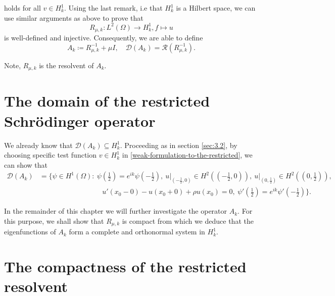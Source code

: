 holds for all $v \in H^{1}_{k}$. Using the last remark, i.e that $H^{1}_{k}$ is a Hilbert space, we can use similar arguments as above to prove that 
	\[ R_{\mu, k} \colon L^{2}(\Omega) \rightarrow H^{1}_{k},  f \mapsto u \]
is well-defined and injective. Consequently, we are able to define
	\[ A_{k} \coloneqq R_{\mu, k}^{-1} + \mu I, \quad \mathcal{D}(A_{k}) = \mathcal{R}(R_{\mu, k}^{-1}). \] 
	
\begin{remark}
	Note, $R_{\mu, k}$ is the resolvent of $A_{k}$.
\end{remark}

\section{The domain of the restricted Schrödinger operator}

We already know that $\mathcal{D}(A_{k}) \subseteq H^{1}_{k}$. Proceeding as in section \ref{sec:3.2}, by choosing specific test function $v \in H^{1}_{k}$ in \eqref{weak-formulation-to-the-restricted}, we can show that
\begin{align*}
	\mathcal{D}(A_{k}) & = \Big\{ \psi \in H^{1}(\Omega) \colon ~\psi\left(\frac{1}{2}\right) = e^{ik} \psi\left(-\frac{1}{2}\right), ~ u\big|_{\left(-\frac{1}{2}, 0\right)} \in H^{2}\left(\left(-\frac{1}{2}, 0\right)\right), ~ u\big|_{\left(0, \frac{1}{2}\right)} \in H^{2}\left(\left(0, \frac{1}{2}\right)\right),  \\
	& ~\qquad ~\qquad ~\qquad ~\qquad u'(x_{0}-0) - u(x_{0} + 0) + \rho u(x_{0}) = 0,  ~ \psi'\left(\frac{1}{2}\right) = e^{ik} \psi'\left(-\frac{1}{2}\right) \Big\}. 
\end{align*}


In the remainder of this chapter we will further investigate the operator $A_{k}$. For this purpose, we shall show that $R_{\mu, k}$ is compact from which we deduce that the eigenfunctions of $A_{k}$ form a complete and orthonormal system in $H^{1}_{k}$.

\section{The compactness of the restricted resolvent} 

